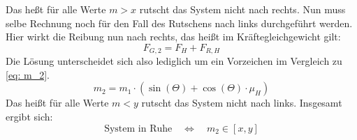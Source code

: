 Das heßt für alle Werte $m > x$ rutscht das System nicht nach rechts. Nun muss selbe Rechnung noch für den Fall des Rutschens nach
links durchgeführt werden. Hier wirkt die Reibung nun nach rechts, das heißt im Kräftegleichgewicht gilt:
\begin{equation}
  F_{G,2}  = F_H + F_{R,H}
\end{equation}
Die Lösung unterscheidet sich also lediglich um ein Vorzeichen im Vergleich zu \eqref{eq: m_2}.
\begin{equation}
  m_2 = m_1 \cdot (\sin\left(\Theta\right) + \cos\left(\Theta\right)  \cdot \mu_H)
\end{equation}
Das heißt für alle Werte $m < y$ rutscht das System nicht nach links. Insgesamt ergibt sich:
\begin{equation}
  \text{System in Ruhe} \quad \Leftrightarrow \quad m_2 \in [x,y]
\end{equation}


\newpage
